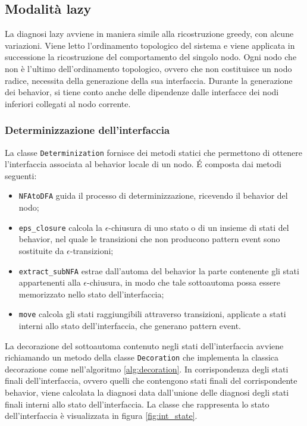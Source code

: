 \subsection{Modalità lazy}
La diagnosi lazy avviene in maniera simile alla ricostruzione greedy, con alcune variazioni. 
Viene letto l'ordinamento topologico del sistema e viene applicata in successione la ricostruzione del comportamento del singolo nodo. Ogni nodo che non è l'ultimo dell'ordinamento topologico, ovvero che non costituisce un nodo radice, necessita della generazione della sua interfaccia. Durante la generazione dei behavior, si tiene conto anche delle dipendenze dalle interfacce dei nodi inferiori collegati al nodo corrente.


\subsubsection{Determinizzazione dell'interfaccia}
La classe \verb|Determinization| fornisce dei metodi statici che permettono di ottenere l'interfaccia associata al behavior locale di un nodo. 
\'E composta dai metodi seguenti:
\begin{itemize}
\item \verb|NFAtoDFA| guida il processo di determinizzazione, ricevendo il behavior del nodo;
\item \verb|eps_closure| calcola la $\epsilon$-chiusura di uno stato o di un insieme di stati del behavior, nel quale le transizioni che non producono pattern event sono sostituite da $\epsilon$-transizioni;
\item \verb|extract_subNFA| estrae dall'automa del behavior la parte contenente gli stati appartenenti alla $\epsilon$-chiusura, in modo che tale sottoautoma possa essere memorizzato nello stato dell'interfaccia;
\item \verb|move| calcola gli stati raggiungibili attraverso transizioni, applicate a stati interni allo stato dell'interfaccia, che generano pattern event.
\end{itemize}
La decorazione del sottoautoma contenuto negli stati dell'interfaccia avviene richiamando un metodo della classe \verb|Decoration| che implementa la classica decorazione come nell'algoritmo \ref{alg:decoration}.
In corrispondenza degli stati finali dell'interfaccia, ovvero quelli che contengono stati finali del corrispondente behavior, viene calcolata la diagnosi data dall'unione delle diagnosi degli stati finali interni allo stato dell'interfaccia.
La classe che rappresenta lo stato dell'interfaccia è visualizzata in figura \ref{fig:int_state}.



